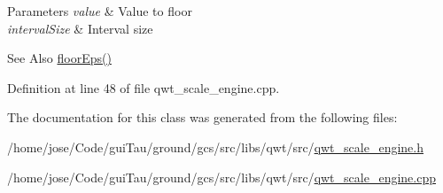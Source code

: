 \begin{DoxyParams}{Parameters}
{\em value} & Value to floor \\
\hline
{\em interval\-Size} & Interval size\\
\hline
\end{DoxyParams}
\begin{DoxySeeAlso}{See Also}
\hyperlink{class_qwt_scale_arithmetic_a924d97f2e5db236f43f4d65e430e09c1}{floor\-Eps()} 
\end{DoxySeeAlso}


Definition at line 48 of file qwt\-\_\-scale\-\_\-engine.\-cpp.



The documentation for this class was generated from the following files\-:\begin{DoxyCompactItemize}
\item 
/home/jose/\-Code/gui\-Tau/ground/gcs/src/libs/qwt/src/\hyperlink{qwt__scale__engine_8h}{qwt\-\_\-scale\-\_\-engine.\-h}\item 
/home/jose/\-Code/gui\-Tau/ground/gcs/src/libs/qwt/src/\hyperlink{qwt__scale__engine_8cpp}{qwt\-\_\-scale\-\_\-engine.\-cpp}\end{DoxyCompactItemize}
